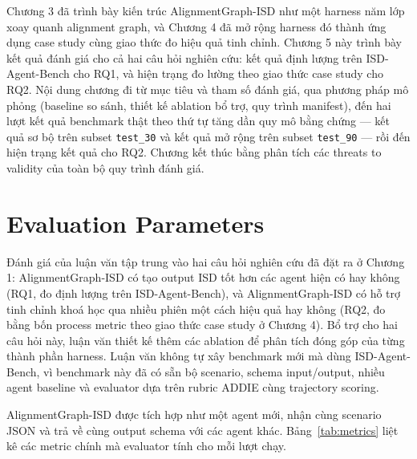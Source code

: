 \documentclass[../main.tex]{subfiles}
\begin{document}
Chương 3 đã trình bày kiến trúc AlignmentGraph-ISD như một harness năm lớp xoay quanh alignment graph, và Chương 4 đã mở rộng harness đó thành ứng dụng case study cùng giao thức đo hiệu quả tinh chỉnh. Chương 5 này trình bày kết quả đánh giá cho cả hai câu hỏi nghiên cứu: kết quả định lượng trên ISD-Agent-Bench cho RQ1, và hiện trạng đo lường theo giao thức case study cho RQ2. Nội dung chương đi từ mục tiêu và tham số đánh giá, qua phương pháp mô phỏng (baseline so sánh, thiết kế ablation bổ trợ, quy trình manifest), đến hai lượt kết quả benchmark thật theo thứ tự tăng dần quy mô bằng chứng — kết quả sơ bộ trên subset \texttt{test\_30} và kết quả mở rộng trên subset \texttt{test\_90} — rồi đến hiện trạng kết quả cho RQ2. Chương kết thúc bằng phân tích các threats to validity của toàn bộ quy trình đánh giá.

\section{Evaluation Parameters}

Đánh giá của luận văn tập trung vào hai câu hỏi nghiên cứu đã đặt ra ở Chương 1: AlignmentGraph-ISD có tạo output ISD tốt hơn các agent hiện có hay không (RQ1, đo định lượng trên ISD-Agent-Bench), và AlignmentGraph-ISD có hỗ trợ tinh chỉnh khoá học qua nhiều phiên một cách hiệu quả hay không (RQ2, đo bằng bốn process metric theo giao thức case study ở Chương 4). Bổ trợ cho hai câu hỏi này, luận văn thiết kế thêm các ablation để phân tích đóng góp của từng thành phần harness. Luận văn không tự xây benchmark mới mà dùng ISD-Agent-Bench, vì benchmark này đã có sẵn bộ scenario, schema input/output, nhiều agent baseline và evaluator dựa trên rubric ADDIE cùng trajectory scoring.

AlignmentGraph-ISD được tích hợp như một agent mới, nhận cùng scenario JSON và trả về cùng output schema với các agent khác. Bảng~\ref{tab:metrics} liệt kê các metric chính mà evaluator tính cho mỗi lượt chạy.
\end{document}
